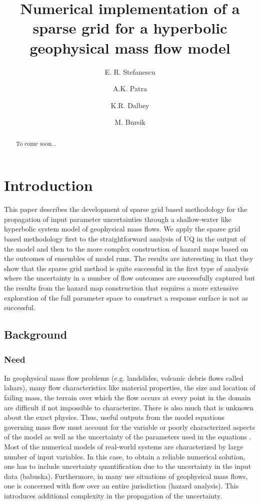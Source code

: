 \documentclass{article}
\begin{document}
\title{Numerical implementation of a sparse grid for a hyperbolic geophysical mass flow model}
\author[1]{ E. R. Stefanescu }
\author[1]{A.K. Patra}
\author[2]{K.R. Dalbey}
\author[3]{M. Bursik}




\maketitle

\begin{abstract}
To come soon...
\end{abstract}


\section{Introduction}
This paper describes the development of sparse grid based methodology for the propagation of input 
parameter uncertainties through a shallow-water like hyperbolic system model of 
geophysical mass flows. We apply the sparse grid based 
methodology first to the straightforward analysis of  UQ in the output of 
the model and then to the more complex construction of hazard maps based on the 
outcomes of ensembles of model runs. The results are interesting in that they show that the sparse grid 
method is quite successful in the first type of analysis where the uncertainty in a number of flow outcomes are successfully 
captured but the results from the hazard map construction that requires a more extensive exploration of the 
full parameter space to construct a response surface is not as successful.

\subsection{Background} 
\subsubsection{Need} In geophysical mass flow problems (e.g. landslides, volcanic debris flows called lahars), many flow characteristics like
material properties, the size and location of failing mass, the terrain over which the 
flow occurs at every point in the domain are difficult if not impossible to characterize. There is also much that is unknown about the
exact physics. Thus, useful outputs from the model equations governing mass flow must account for 
the variable or poorly characterized aspects of the model as well as the uncertainty of the 
parameters used in the equations \citep{Keith}. 
Most of the numerical models of real-world systems are characterized by large number of input
variables. In this case, to obtain a reliable numerical 
solution, one has to include uncertainty quantification due to the uncertainty in the input data (babuska). Furthermore, 
in many use situations of geophysical mass flows, one is concerned with flow over an entire jurisdiction (hazard analysis). 
This introduces additional complexity in the propagation of the uncertainty.
\end{document}
